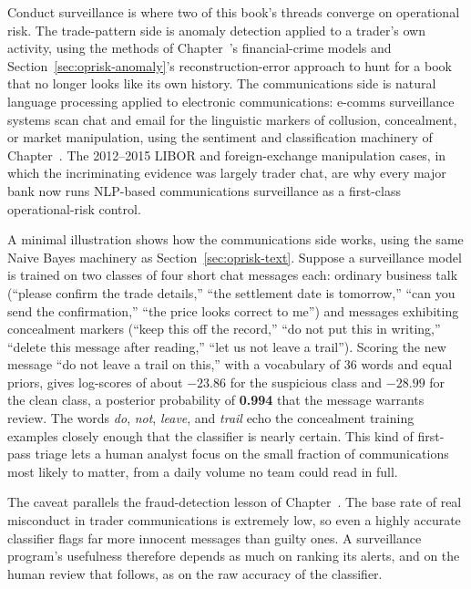 \documentclass[../ai_in_finance]{subfiles}
\begin{document}
Conduct surveillance is where two of this book's threads converge on operational risk. The trade-pattern side is anomaly detection applied to a trader's own activity, using the methods of Chapter~'s financial-crime models and Section~\ref{sec:oprisk-anomaly}'s reconstruction-error approach to hunt for a book that no longer looks like its own history. The communications side is natural language processing applied to electronic communications: e-comms surveillance systems scan chat and email for the linguistic markers of collusion, concealment, or market manipulation, using the sentiment and classification machinery of Chapter~. The 2012--2015 LIBOR and foreign-exchange manipulation cases, in which the incriminating evidence was largely trader chat, are why every major bank now runs NLP-based communications surveillance as a first-class operational-risk control.

A minimal illustration shows how the communications side works, using the same Naive Bayes machinery as Section~\ref{sec:oprisk-text}. Suppose a surveillance model is trained on two classes of four short chat messages each: ordinary business talk (``please confirm the trade details,'' ``the settlement date is tomorrow,'' ``can you send the confirmation,'' ``the price looks correct to me'') and messages exhibiting concealment markers (``keep this off the record,'' ``do not put this in writing,'' ``delete this message after reading,'' ``let us not leave a trail''). Scoring the new message ``do not leave a trail on this,'' with a vocabulary of 36 words and equal priors, gives log-scores of about $-23.86$ for the suspicious class and $-28.99$ for the clean class, a posterior probability of \textbf{0.994} that the message warrants review. The words \emph{do}, \emph{not}, \emph{leave}, and \emph{trail} echo the concealment training examples closely enough that the classifier is nearly certain. This kind of first-pass triage lets a human analyst focus on the small fraction of communications most likely to matter, from a daily volume no team could read in full.

The caveat parallels the fraud-detection lesson of Chapter~. The base rate of real misconduct in trader communications is extremely low, so even a highly accurate classifier flags far more innocent messages than guilty ones. A surveillance program's usefulness therefore depends as much on ranking its alerts, and on the human review that follows, as on the raw accuracy of the classifier.
\end{document}
